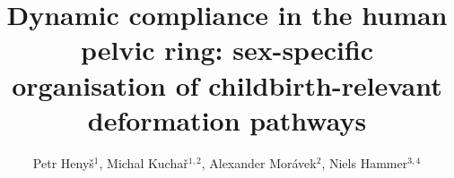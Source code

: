 \documentclass[openacc]{rsproca_new}
\begin{document}
\title{Dynamic compliance in the human pelvic ring: sex-specific organisation of childbirth-relevant deformation pathways}

\author{Petr Heny\v{s}$^{1}$, Michal Kucha\v{r}$^{1,2}$, Alexander Mor\'{a}vek$^{2}$, Niels Hammer$^{3,4}$}

\address{$^{1}$Institute of New Technologies and Applied Informatics, Faculty of Mechatronics, Informatics and Interdisciplinary Studies, Technical University of Liberec, Liberec, Czech Republic\\
$^{2}$Department of Anatomy, Faculty of Medicine in Hradec Kr\'{a}lov\'{e}, Charles University, Hradec Kr\'{a}lov\'{e}, Czech Republic\\
$^{3}$Division of Macroscopic and Clinical Anatomy, Gottfried Schatz Research Center, Medical University of Graz, Graz, Austria\\
$^{4}$Division of Macroscopic and Clinical Anatomy, Gottfried Schatz Research Center, Medical University of Graz, Graz, Austria; Department of Orthopedic and Trauma Surgery, University of Leipzig, Leipzig, Germany; Division of Biomechatronics, Fraunhofer IWU, Dresden, Germany}

\subject{biomechanics, evolutionary anthropology, obstetrics}


\end{document}
